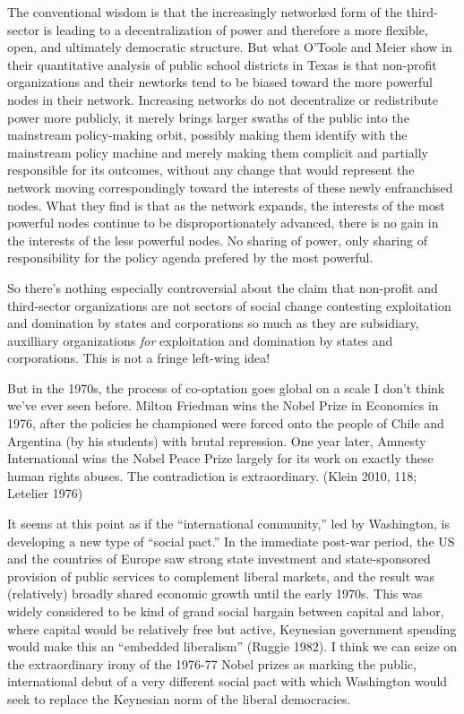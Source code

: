 \documentclass[12pt,book]{article}
\begin{document}
The conventional wisdom is that the increasingly networked form of the
third-sector is leading to a decentralization of power and therefore a
more flexible, open, and ultimately democratic structure. But what
O'Toole and Meier show in their quantitative analysis of public school
districts in Texas is that non-profit organizations and their newtorks
tend to be biased toward the more powerful nodes in their network.
Increasing networks do not decentralize or redistribute power more
publicly, it merely brings larger swaths of the public into the
mainstream policy-making orbit, possibly making them identify with the
mainstream policy machine and merely making them complicit and partially
responsible for its outcomes, without any change that would represent
the network moving correspondingly toward the interests of these newly
enfranchised nodes. What they find is that as the network expands, the
interests of the most powerful nodes continue to be disproportionately
advanced, there is no gain in the interests of the less powerful nodes.
No sharing of power, only sharing of responsibility for the policy
agenda prefered by the most powerful.

So there's nothing especially controversial about the claim that
non-profit and third-sector organizations are not sectors of social
change contesting exploitation and domination by states and corporations
so much as they are subsidiary, auxilliary organizations \emph{for}
exploitation and domination by states and corporations. This is not a
fringe left-wing idea!

But in the 1970s, the process of co-optation goes global on a scale I
don't think we've ever seen before. Milton Friedman wins the Nobel Prize
in Economics in 1976, after the policies he championed were forced onto
the people of Chile and Argentina (by his students) with brutal
repression. One year later, Amnesty International wins the Nobel Peace
Prize largely for its work on exactly these human rights abuses. The
contradiction is extraordinary. (Klein 2010, 118; Letelier 1976)

It seems at this point as if the ``international community,'' led by
Washington, is developing a new type of ``social pact.'' In the
immediate post-war period, the US and the countries of Europe saw strong
state investment and state-sponsored provision of public services to
complement liberal markets, and the result was (relatively) broadly
shared economic growth until the early 1970s. This was widely considered
to be kind of grand social bargain between capital and labor, where
capital would be relatively free but active, Keynesian government
spending would make this an ``embedded liberalism'' (Ruggie 1982). I
think we can seize on the extraordinary irony of the 1976-77 Nobel
prizes as marking the public, international debut of a very different
social pact with which Washington would seek to replace the Keynesian
norm of the liberal democracies.
\end{document}
